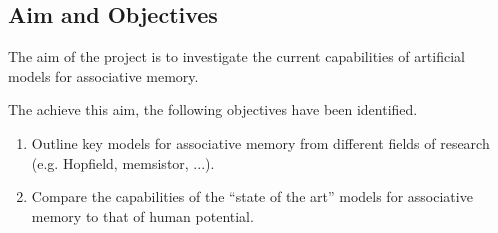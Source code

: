 \subsection{Aim and Objectives}



The aim of the project is to investigate the current capabilities of artificial models for associative memory.

The achieve this aim, the following objectives have been identified.

\begin{enumerate}
	\item Outline key models for associative memory from different fields of research (e.g. Hopfield, memsistor, ...).
	\item Compare the capabilities of the ``state of the art'' models for associative memory to that of human potential.
\end{enumerate}
